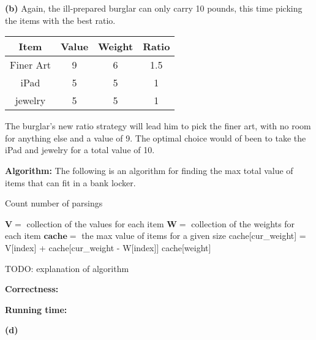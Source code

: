 \documentclass[11pt]{article}
\renewcommand\part[1]{\vspace{.10in}\textbf{(#1)}}
\newcommand\algorith{\vspace{.10in}\textbf{Algorithm: }}
\newcommand\correctness{\vspace{.10in}\textbf{Correctness: }}
\newcommand\runtime{\vspace{.10in}\textbf{Running time: }}
\begin{document}
\part{b} Again, the ill-prepared burglar can only carry 10 pounds, this time picking the items with the best ratio.

\begin{table}[H]
\centering
{\renewcommand{\arraystretch}{1.2}%
\begin{tabular}{| c | c | c | c |}
\hline
Item& Value& Weight& Ratio\\
\hline
Finer Art & 9& 6&1.5 \\ \hline
iPad & 5& 5&1\\ \hline
jewelry  & 5& 5&1\\ \hline
\end{tabular}}
\end{table}

The burglar's new ratio strategy will lead him to pick the finer art, with no room for anything else and a value of 9. The optimal choice would of been to take the iPad and jewelry for a total value of 10.

\algorith The following is an algorithm for finding the max total value of items that can fit in a bank locker.

\begin{algorithm}[H]
\caption{Count number of parsings}
\label{CHalgorithm}
\begin{algorithmic}[1]
\Variables
\State $\mathbf{V} = $ collection of the values for each item
\State $\mathbf{W} =$ collection of the weights for each item
\State $\mathbf{cache} =$ the max value of items for a given size
\EndVariables
\State
{}
				\State cache[cur\_weight] = V[index] + cache[cur\_weight - W[index]]
			\EndIf
		\EndIf
	\EndFor
\EndFor
\State
\State \Return cache[weight]
\EndProcedure
\end{algorithmic}
\end{algorithm}

TODO: explanation of algorithm

\correctness

\runtime 

\part{d}
\end{document}
